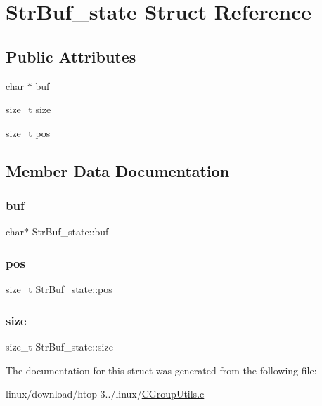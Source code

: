\hypertarget{structStrBuf__state}{}\section{Str\+Buf\+\_\+state Struct Reference}
\label{structStrBuf__state}
\subsection*{Public Attributes}
\begin{DoxyCompactItemize}
\item 
char $\ast$ \hyperlink{structStrBuf__state_a6cd297869666e9882adb315bd4cee263}{buf}
\item 
size\+\_\+t \hyperlink{structStrBuf__state_a9fd0040ff5272af2b41753b9e8f1c13e}{size}
\item 
size\+\_\+t \hyperlink{structStrBuf__state_a8af8d06211a4f089058e7aef5ca1daf1}{pos}
\end{DoxyCompactItemize}


\subsection{Member Data Documentation}
\mbox{\label{structStrBuf__state_a6cd297869666e9882adb315bd4cee263}} 
\subsubsection{\texorpdfstring{buf}{buf}}
{\footnotesize\ttfamily char$\ast$ Str\+Buf\+\_\+state\+::buf}

\mbox{\label{structStrBuf__state_a8af8d06211a4f089058e7aef5ca1daf1}} 
\subsubsection{\texorpdfstring{pos}{pos}}
{\footnotesize\ttfamily size\+\_\+t Str\+Buf\+\_\+state\+::pos}

\mbox{\label{structStrBuf__state_a9fd0040ff5272af2b41753b9e8f1c13e}} 
\subsubsection{\texorpdfstring{size}{size}}
{\footnotesize\ttfamily size\+\_\+t Str\+Buf\+\_\+state\+::size}



The documentation for this struct was generated from the following file\+:\begin{DoxyCompactItemize}
\item 
linux/download/htop-\/3../linux/\hyperlink{CGroupUtils_8c}{C\+Group\+Utils.\+c}\end{DoxyCompactItemize}
